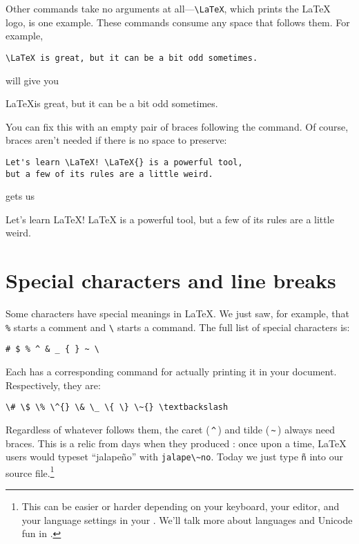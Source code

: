 Other commands take no arguments at all---\verb|\LaTeX|,
which prints the \LaTeX{} logo, is one example.
These commands consume any space that follows them.
For example,
\begin{leftfigure}
\begin{lstlisting}
\LaTeX is great, but it can be a bit odd sometimes.
\end{lstlisting}
\end{leftfigure}
will give you
\begin{leftfigure}
\lm \LaTeX is great, but it can be a bit odd sometimes.
\end{leftfigure}
You can fix this with an empty pair of braces following the command.
Of course, braces aren't needed if there is no space to preserve:
\begin{leftfigure}
\begin{lstlisting}
Let's learn \LaTeX! \LaTeX{} is a powerful tool,
but a few of its rules are a little weird.
\end{lstlisting}
\end{leftfigure}
gets us
\begin{leftfigure}
\lm Let's learn \LaTeX! \LaTeX{} is a powerful tool,
but a few of its rules are a little weird.
\end{leftfigure}

\section{Special characters and line breaks}

Some characters have special meanings in \LaTeX.
We just saw, for example, that \verb|%| starts a comment
and \verb|\| starts a command.
The full list of special characters is:
\begin{leftfigure}
\begin{lstlisting}
# $ % ^ & _ { } ~ \
\end{lstlisting}
\end{leftfigure}
Each has a corresponding command
for actually printing it in your document. Respectively, they are:
\begin{leftfigure}
\begin{lstlisting}
\# \$ \% \^{} \& \_ \{ \} \~{} \textbackslash
\end{lstlisting}
\end{leftfigure}
Regardless of whatever follows them,
the caret (\,\texttt{\^{}}\,) and tilde (\,\texttt{\~{}}\,) always need braces.
This is a relic from days when they produced :
once upon a time, \LaTeX{} users would typeset ``jalapeño'' with
\verb|jalape\~no|.
Today we just type \texttt{ñ} into our source
file.\punckern\footnote{This can be easier or harder depending
on your keyboard, your editor, and your language settings in your .
We'll talk more about languages and Unicode fun in .}

